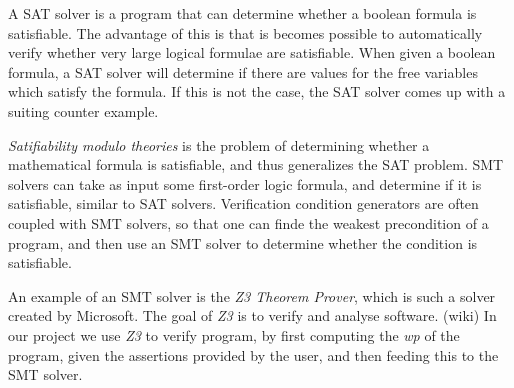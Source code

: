 
A SAT solver is a program that can determine whether a boolean formula is satisfiable. The advantage of this is that is becomes possible to automatically verify whether very large logical formulae are satisfiable.
When given a boolean formula, a SAT solver will determine if there are values for the free variables which satisfy the formula. If this is not the case, the SAT solver comes up with a suiting counter example.

\textit{Satifiability modulo theories} is the problem of determining whether a mathematical formula is satisfiable, and thus generalizes the SAT problem. SMT solvers can take as input some first-order logic formula, and determine if it is satisfiable, similar to SAT solvers.
Verification condition generators are often coupled with SMT solvers, so that one can finde the weakest precondition of a program, and then use an SMT solver to determine whether the condition is satisfiable.

An example of an SMT solver is the \textit{Z3 Theorem Prover}, which is such a solver created by Microsoft. The goal of \textit{Z3} is to verify and analyse software. (wiki)
In our project we use \textit{Z3} to verify program, by first computing the \textit{wp} of the program, given the assertions provided by the user, and then feeding this to the SMT solver.
